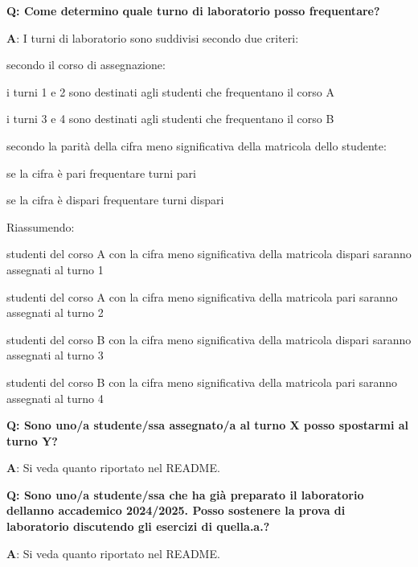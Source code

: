 {\bfseries{Q\+: Come determino quale turno di laboratorio posso frequentare?}}

{\bfseries{A}}\+: I turni di laboratorio sono suddivisi secondo due criteri\+:


\begin{DoxyEnumerate}
\item secondo il corso di assegnazione\+:
\begin{DoxyItemize}
\item i turni 1 e 2 sono destinati agli studenti che frequentano il corso A
\item i turni 3 e 4 sono destinati agli studenti che frequentano il corso B
\end{DoxyItemize}
\item secondo la parità della cifra meno significativa della matricola dello studente\+:
\begin{DoxyItemize}
\item se la cifra è pari frequentare turni pari
\item se la cifra è dispari frequentare turni dispari
\end{DoxyItemize}
\end{DoxyEnumerate}

Riassumendo\+:
\begin{DoxyItemize}
\item studenti del corso A con la cifra meno significativa della matricola dispari saranno assegnati al turno 1
\item studenti del corso A con la cifra meno significativa della matricola pari saranno assegnati al turno 2
\item studenti del corso B con la cifra meno significativa della matricola dispari saranno assegnati al turno 3
\item studenti del corso B con la cifra meno significativa della matricola pari saranno assegnati al turno 4
\end{DoxyItemize}

{\bfseries{Q\+: Sono uno/a studente/ssa assegnato/a al turno X posso spostarmi al turno Y?}}

{\bfseries{A}}\+: Si veda quanto riportato nel README.

{\bfseries{Q\+: Sono uno/a studente/ssa che ha già preparato il laboratorio dell\textquotesingle{}anno accademico 2024/2025. Posso sostenere la prova di laboratorio discutendo gli esercizi di quell\textquotesingle{}a.\+a.?}}

{\bfseries{A}}\+: Si veda quanto riportato nel README.


